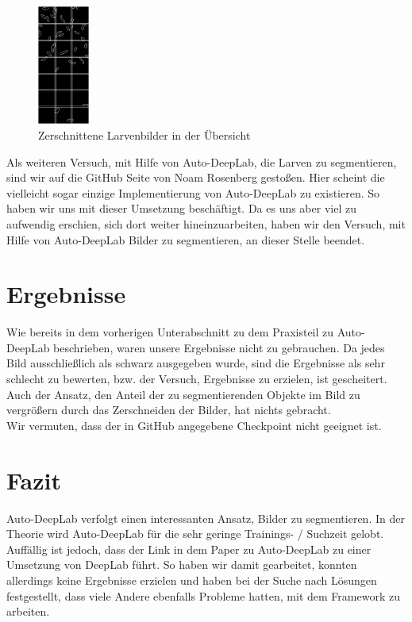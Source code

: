 \begin{figure}[H]
	\centering
	\includegraphics[width=0.15\textwidth]{Pictures/AutoDeepLab/ZerschnittBoxen-Beispiel.png}
	\caption{Zerschnittene Larvenbilder in der Übersicht}
	\label{pic:zerschnitteneLarven}
\end{figure}

Als weiteren Versuch, mit Hilfe von Auto-DeepLab, die Larven zu segmentieren, sind wir auf die GitHub Seite von Noam Rosenberg \cite{deeplabRosenberg} gestoßen. Hier scheint die vielleicht sogar einzige Implementierung von Auto-DeepLab zu existieren. So haben wir uns mit dieser Umsetzung beschäftigt. Da es uns aber viel zu aufwendig erschien, sich dort weiter hineinzuarbeiten, haben wir den Versuch, mit Hilfe von Auto-DeepLab Bilder zu segmentieren, an dieser Stelle beendet.

\section{Ergebnisse}

Wie bereits in dem vorherigen Unterabschnitt zu dem Praxisteil zu Auto-DeepLab beschrieben, waren unsere Ergebnisse nicht zu gebrauchen. Da jedes Bild ausschließlich als schwarz ausgegeben wurde, sind die Ergebnisse als sehr schlecht zu bewerten, bzw. der Versuch, Ergebnisse zu erzielen, ist gescheitert. Auch der Ansatz, den Anteil der zu segmentierenden Objekte im Bild zu vergrößern durch das Zerschneiden der Bilder, hat nichts gebracht.\\
Wir vermuten, dass der in GitHub angegebene Checkpoint nicht geeignet ist.

\section{Fazit}

Auto-DeepLab verfolgt einen interessanten Ansatz, Bilder zu segmentieren. In der Theorie wird Auto-DeepLab für die sehr geringe Trainings- / Suchzeit gelobt. Auffällig ist jedoch, dass der Link in dem Paper zu Auto-DeepLab \cite{autodeeplabPaper} zu einer Umsetzung von DeepLab \cite{deeplabGithub} führt.  So haben wir damit gearbeitet, konnten allerdings keine Ergebnisse erzielen und haben bei der Suche nach Lösungen festgestellt, dass viele Andere ebenfalls Probleme hatten, mit dem Framework zu arbeiten.

